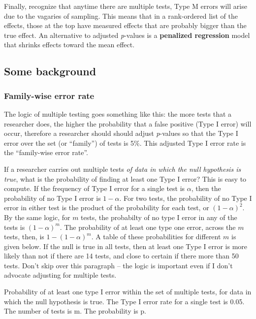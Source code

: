 \documentclass[]{book}
\begin{document}
Finally, recognize that anytime there are multiple tests, Type M errors will arise due to the vagaries of sampling. This means that in a rank-ordered list of the effects, those at the top have measured effects that are probably bigger than the true effect. An alternative to adjusted \emph{p}-values is a \textbf{penalized regression} model that shrinks effects toward the mean effect.

\hypertarget{some-background}{%
\subsection{Some background}\label{some-background}}

\hypertarget{family-wise-error-rate}{%
\subsubsection{Family-wise error rate}\label{family-wise-error-rate}}

The logic of multiple testing goes something like this: the more tests that a researcher does, the higher the probability that a false positive (Type I error) will occur, therefore a researcher should should adjust \emph{p}-values so that the Type I error over the set (or ``family'') of tests is 5\%. This adjusted Type I error rate is the ``family-wise error rate''.

If a researcher carries out multiple tests \emph{of data in which the null hypothesis is true}, what is the probability of finding at least one Type I error? This is easy to compute. If the frequency of Type I error for a single test is \(\alpha\), then the probability of no Type I error is \(1 - \alpha\). For two tests, the probability of no Type I error in either test is the product of the probability for each test, or \((1 - \alpha)^2\). By the same logic, for \(m\) tests, the probabilty of no type I error in any of the tests is \((1 - \alpha)^m\). The probability of at least one type one error, across the \(m\) tests, then, is \(1 - (1 - \alpha)^m\). A table of these probabilities for different \(m\) is given below. If the null is true in all tests, then at least one Type I error is more likely than not if there are 14 tests, and close to certain if there more than 50 tests. Don't skip over this paragraph -- the logic is important even if I don't advocate adjusting for multiple tests.

\label{tab:best-type1-table}Probability of at least one type I error within the set of multiple tests, for data in which the null hypothesis is true. The Type I error rate for a single test is 0.05. The number of tests is m. The probability is p.
\end{document}
